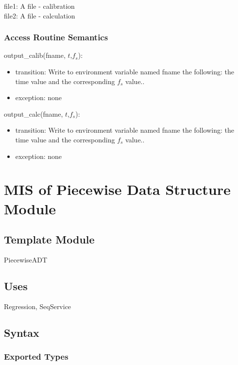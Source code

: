 \documentclass[12pt, titlepage]{article}
\begin{document}
file1: A  file - calibration\\
file2: A  file - calculation\\

\subsubsection{Access Routine Semantics}

\noindent output\_calib(fname, $t$,$f_s$):
\begin{itemize}
\item transition:  Write to environment variable named fname the
  following: the time value and the corresponding $f_s$ value..  
\item exception: none
\end{itemize}

\noindent output\_calc(fname, $t$,$f_s$):
\begin{itemize}
\item transition:  Write to environment variable named fname the
  following: the time value and the corresponding $f_s$ value..  
\item exception: none
\end{itemize}

\newpage

\section{MIS of Piecewise Data Structure Module} \label{piecewise}

\subsection{Template Module}

PiecewiseADT

\subsection{Uses}

Regression, SeqService

\subsection{Syntax}

\subsubsection* {Exported Types}
\end{document}
